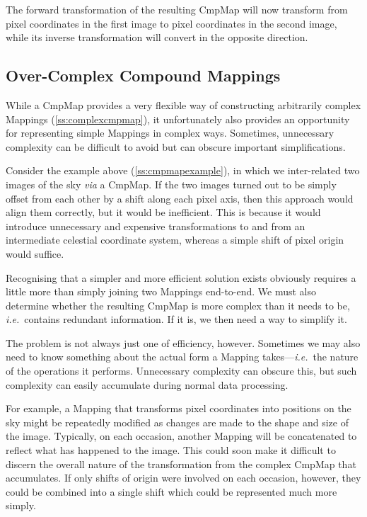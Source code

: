 \documentclass[twoside,11pt]{article}
\newcommand{\secref}[1]{\S\ref{#1}}
\renewcommand{\secref}[1]{\ref{#1}}
\begin{document}
The forward transformation of the resulting CmpMap will now transform
from pixel coordinates in the first image to pixel coordinates in the
second image, while its inverse transformation will convert in the
opposite direction.

\subsection{\label{ss:overcomplexcmpmaps}Over-Complex Compound Mappings}

While a CmpMap provides a very flexible way of constructing
arbitrarily complex Mappings (\secref{ss:complexcmpmap}), it
unfortunately also provides an opportunity for representing simple
Mappings in complex ways. Sometimes, unnecessary complexity can be
difficult to avoid but can obscure important simplifications.

Consider the example above (\secref{ss:cmpmapexample}), in which we
inter-related two images of the sky {\em{via}} a CmpMap.  If the two
images turned out to be simply offset from each other by a shift along
each pixel axis, then this approach would align them correctly, but it
would be inefficient. This is because it would introduce unnecessary
and expensive transformations to and from an intermediate celestial
coordinate system, whereas a simple shift of pixel origin would
suffice.

Recognising that a simpler and more efficient solution exists
obviously requires a little more than simply joining two Mappings
end-to-end. We must also determine whether the resulting CmpMap is
more complex than it needs to be, {\em{i.e.}}\ contains redundant
information. If it is, we then need a way to simplify it.

The problem is not always just one of efficiency, however. Sometimes
we may also need to know something about the actual form a Mapping
takes---{\em{i.e.}}\ the nature of the operations it performs.
Unnecessary complexity can obscure this, but such complexity can
easily accumulate during normal data processing.

For example, a Mapping that transforms pixel coordinates into
positions on the sky might be repeatedly modified as changes are made
to the shape and size of the image. Typically, on each occasion,
another Mapping will be concatenated to reflect what has happened to
the image. This could soon make it difficult to discern the overall
nature of the transformation from the complex CmpMap that
accumulates. If only shifts of origin were involved on each occasion,
however, they could be combined into a single shift which could be
represented much more simply.
\end{document}
